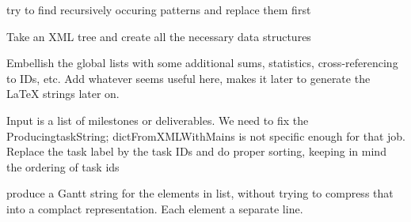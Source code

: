 \documentclass[a4paper,10pt,english]{sphinxmanual}
\begin{document}
\begin{fulllineitems}
\label{sourcecodedoc:latexFromXML.recursiveTemplate}
try to find recursively occuring patterns and replace them first

\end{fulllineitems}


\begin{fulllineitems}
\label{sourcecodedoc:latexFromXML.analyzeTree}
Take an XML tree and create all the necessary data structures

\end{fulllineitems}


\begin{fulllineitems}
\label{sourcecodedoc:latexFromXML.computeStatistics}
Embellish the global lists with some additional sums, statistics,
cross-referencing to IDs, etc. Add whatever seems useful here, makes
it later to generate the LaTeX strings later on.

\end{fulllineitems}


\begin{fulllineitems}
\label{sourcecodedoc:latexFromXML.fixProducingTask}
Input is a list of milestones or deliverables. We need to
fix the ProducingtaskString; dictFromXMLWithMains is not
specific enough for that job. Replace the task label by the task
IDs and do proper sorting, keeping in mind the ordering of task ids

\end{fulllineitems}


\begin{fulllineitems}
\label{sourcecodedoc:latexFromXML.produceUncompressedGantt}
produce a Gantt string for the elements in list, without trying to
compress that into a complact representation. Each element a separate line.

\end{fulllineitems}
\end{document}

